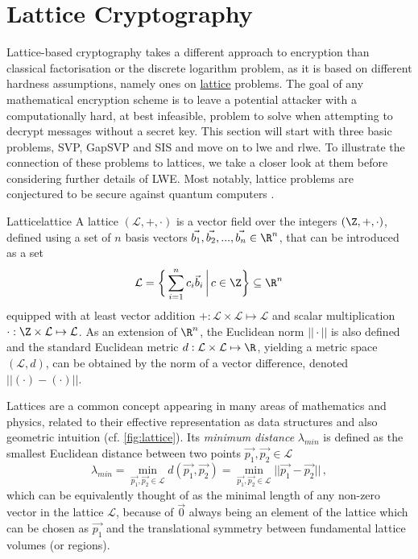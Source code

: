 \section{Lattice Cryptography}
\label{subsec:lattice-crypto}
Lattice-based cryptography takes a different approach to encryption than classical factorisation or the discrete logarithm problem, as it is based on different hardness assumptions, namely ones on \hyperref[def:lattice]{lattice} problems.
The goal of any mathematical encryption scheme is to leave a potential attacker with a computationally hard, at best infeasible, problem to solve when attempting to decrypt messages without a secret key.
This section will start with three basic problems, SVP, GapSVP and SIS and move on to \gls{lwe} and \gls{rlwe}.
To illustrate the connection of these problems to lattices, we take a closer look at them before considering further details of LWE.
Most notably, lattice problems are conjectured to be secure against quantum computers \parencite{2018-lattice-problems}.

\newcommand{\lat}{\mathcal{L}}
\begin{definition}{Lattice}{lattice}
  A lattice $(\lat, +, \cdot)$ is a vector field over the integers $(\Z, +, \cdot)$, defined using a set of $n$ basis vectors $\vec{b_1}, \vec{b_2}, ..., \vec{b_n} \in \R^n$, that can be introduced as a set
  $$\lat = \bigg\{\sum_{i=1}^n c_i \vec{b}_i \,\bigg|\, c \in \Z\bigg\} \subseteq \R^n$$
  equipped with at least vector addition $+: \lat \times \lat \mapsto \lat$ and scalar multiplication $\cdot: \Z \times \lat \mapsto \lat$.
  As an extension of $\R^n$, the Euclidean norm $||\cdot||$ is also defined and the standard Euclidean metric $d: \lat \times \lat \mapsto \R$, yielding a metric space $(\lat, d)$, can be obtained by the norm of a vector difference, denoted $||(\cdot) - (\cdot)||$.
\end{definition}

Lattices are a common concept appearing in many areas of mathematics and physics, related to their effective representation as data structures and also geometric intuition (cf. \autoref{fig:lattice}).
Its \textit{minimum distance} $\lambda_{min}$ is defined as the smallest Euclidean distance between two points $\vec{p_1}, \vec{p_2} \in \lat$
$$\lambda_{min} = \min_{\vec{p_1}, \vec{p_2} \in \lat} d(\vec{p_1}, \vec{p_2}) =
  \min_{\vec{p_1}, \vec{p_2} \in \lat} ||\vec{p_1} - \vec{p_2}|| \,,$$
which can be equivalently thought of as the minimal length of any non-zero vector in the lattice $\lat$, because of $\vec{0}$ always being an element of the lattice which can be chosen as $\vec{p_1}$ and the translational symmetry between fundamental lattice volumes (or regions).

